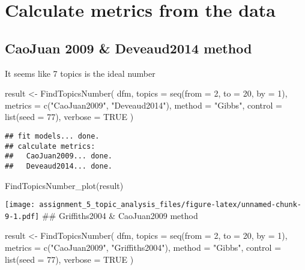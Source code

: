 \documentclass[
]{article}
\newenvironment{Shaded}{\begin{snugshade}}{\end{snugshade}}
\newcommand{\AttributeTok}[1]{\textcolor[rgb]{0.77,0.63,0.00}{#1}}
\newcommand{\ConstantTok}[1]{\textcolor[rgb]{0.00,0.00,0.00}{#1}}
\newcommand{\DecValTok}[1]{\textcolor[rgb]{0.00,0.00,0.81}{#1}}
\newcommand{\FunctionTok}[1]{\textcolor[rgb]{0.00,0.00,0.00}{#1}}
\newcommand{\NormalTok}[1]{#1}
\newcommand{\OtherTok}[1]{\textcolor[rgb]{0.56,0.35,0.01}{#1}}
\newcommand{\StringTok}[1]{\textcolor[rgb]{0.31,0.60,0.02}{#1}}
\begin{document}
\hypertarget{calculate-metrics-from-the-data}{%
\section{Calculate metrics from the
data}\label{calculate-metrics-from-the-data}}

\hypertarget{caojuan-2009-deveaud2014-method}{%
\subsection{CaoJuan 2009 \& Deveaud2014
method}\label{caojuan-2009-deveaud2014-method}}

It seems like 7 topics is the ideal number

\begin{Shaded}
\begin{Highlighting}[]
\NormalTok{result }\OtherTok{\textless{}{-}} \FunctionTok{FindTopicsNumber}\NormalTok{(}
\NormalTok{  dfm,}
  \AttributeTok{topics =} \FunctionTok{seq}\NormalTok{(}\AttributeTok{from =} \DecValTok{2}\NormalTok{, }\AttributeTok{to =} \DecValTok{20}\NormalTok{, }\AttributeTok{by =} \DecValTok{1}\NormalTok{),}
  \AttributeTok{metrics =} \FunctionTok{c}\NormalTok{(}\StringTok{"CaoJuan2009"}\NormalTok{,  }\StringTok{"Deveaud2014"}\NormalTok{),}
  \AttributeTok{method =} \StringTok{"Gibbs"}\NormalTok{,}
  \AttributeTok{control =} \FunctionTok{list}\NormalTok{(}\AttributeTok{seed =} \DecValTok{77}\NormalTok{),}
  \AttributeTok{verbose =} \ConstantTok{TRUE}
\NormalTok{)}
\end{Highlighting}
\end{Shaded}

\begin{verbatim}
## fit models... done.
## calculate metrics:
##   CaoJuan2009... done.
##   Deveaud2014... done.
\end{verbatim}

\begin{Shaded}
\begin{Highlighting}[]
\FunctionTok{FindTopicsNumber\_plot}\NormalTok{(result)}
\end{Highlighting}
\end{Shaded}

\texttt{[image: assignment\_5\_topic\_analysis\_files/figure-latex/unnamed-chunk-9-1.pdf]}
\#\# Griffiths2004 \& CaoJuan2009 method

\begin{Shaded}
\begin{Highlighting}[]
\NormalTok{result }\OtherTok{\textless{}{-}} \FunctionTok{FindTopicsNumber}\NormalTok{(}
\NormalTok{  dfm,}
  \AttributeTok{topics =} \FunctionTok{seq}\NormalTok{(}\AttributeTok{from =} \DecValTok{2}\NormalTok{, }\AttributeTok{to =} \DecValTok{20}\NormalTok{, }\AttributeTok{by =} \DecValTok{1}\NormalTok{),}
  \AttributeTok{metrics =} \FunctionTok{c}\NormalTok{(}\StringTok{"CaoJuan2009"}\NormalTok{, }\StringTok{"Griffiths2004"}\NormalTok{),}
  \AttributeTok{method =} \StringTok{"Gibbs"}\NormalTok{,}
  \AttributeTok{control =} \FunctionTok{list}\NormalTok{(}\AttributeTok{seed =} \DecValTok{77}\NormalTok{),}
  \AttributeTok{verbose =} \ConstantTok{TRUE}
\NormalTok{)}
\end{Highlighting}
\end{Shaded}
\end{document}
